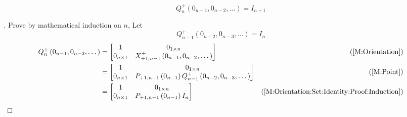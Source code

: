 \documentclass[stu, babel, american, biblatex, a4paper, leqno, draftall]{apa7}
\begin{document}
\begin{corollary}\label{M:Orientation:Set:Identity}
    \begin{equation*}
        Q^{+}_{n}
        \left(0_{n-1}, 0_{n-2}, \dots\right)
        =
        I_{n+1}
    \end{equation*}
\end{corollary}
\begin{proof}[]
    Prove by mathematical induction on $n$,
    Let
    \begin{equation}\label{M:Orientation:Set:Identity:Proof:Induction}
        Q^+_{n-1}\left(0_{n-2}, 0_{n-3}, \dots\right)=I_n
    \end{equation}
    \begin{align*}
        Q^+_n\left(0_{n-1}, 0_{n-2}, \dots\right)
                                                                                                       & =
        \begin{bmatrix}
            1             & 0_{1\times n}                                    \\
            0_{n\times 1} & X^\pm_{+1,n-1}\left(0_{n-1},0_{n-2},\dots\right) \\
        \end{bmatrix}                            & \text{(\cref{M:Orientation})}                                                               \\
                                                                                                       & =
        \begin{bmatrix}
            1             & 0_{1\times n}                                                               \\
            0_{n\times 1} & P_{+1,n-1}\left(0_{n-1}\right)Q^+_{n-1}\left(0_{n-2}, 0_{n-3}, \dots\right) \\
        \end{bmatrix} & \text{(\cref{M:Point})}                                            \\
                                                                                                       & =
        \begin{bmatrix}
            1             & 0_{1\times n}                      \\
            0_{n\times 1} & P_{+1,n-1}\left(0_{n-1}\right) I_n \\
        \end{bmatrix}                                          & \text{(\cref{M:Orientation:Set:Identity:Proof:Induction})}                    \\

\end{align*}
\end{proof}
\end{document}
